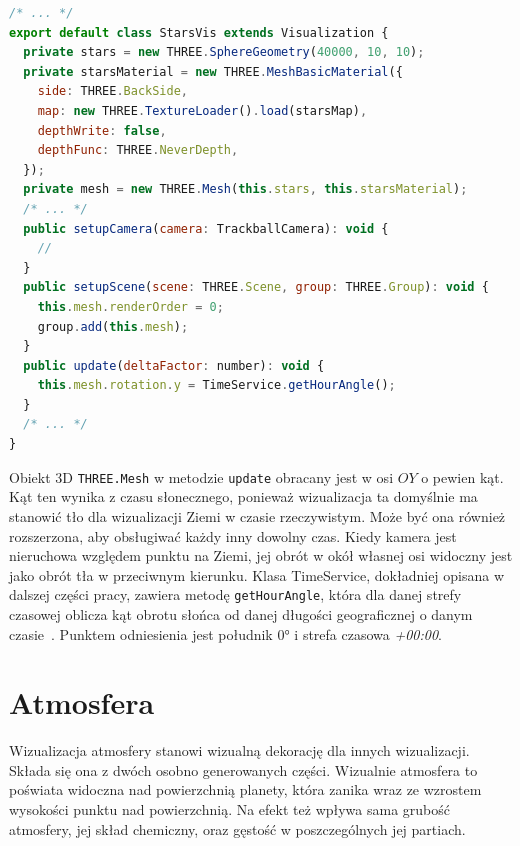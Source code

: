 \begin{lstlisting}[float, language=javascript, label={lst:starsVis}, caption={
    Fragmenty klasy \texttt{StarsVis}}
]
/* ... */
export default class StarsVis extends Visualization {
  private stars = new THREE.SphereGeometry(40000, 10, 10);
  private starsMaterial = new THREE.MeshBasicMaterial({
    side: THREE.BackSide,
    map: new THREE.TextureLoader().load(starsMap),
    depthWrite: false,
    depthFunc: THREE.NeverDepth,
  });
  private mesh = new THREE.Mesh(this.stars, this.starsMaterial);
  /* ... */
  public setupCamera(camera: TrackballCamera): void {
    //
  }
  public setupScene(scene: THREE.Scene, group: THREE.Group): void {
    this.mesh.renderOrder = 0;
    group.add(this.mesh);
  }
  public update(deltaFactor: number): void {
    this.mesh.rotation.y = TimeService.getHourAngle();
  }
  /* ... */
}
\end{lstlisting}

Obiekt 3D \texttt{THREE.Mesh} w metodzie \texttt{update} obracany jest w osi $OY$ o pewien kąt. Kąt ten wynika z czasu słonecznego, ponieważ wizualizacja ta domyślnie ma stanowić tło dla wizualizacji Ziemi w czasie rzeczywistym. Może być ona również rozszerzona, aby obsługiwać każdy inny dowolny czas. Kiedy kamera jest nieruchowa względem punktu na Ziemi, jej obrót w okół własnej osi widoczny jest jako obrót tła w przeciwnym kierunku. Klasa TimeService, dokładniej opisana w dalszej części pracy, zawiera metodę \texttt{getHourAngle}, która dla danej strefy czasowej oblicza kąt obrotu słońca od danej długości geograficznej o danym czasie~\cite{SolarTime}. Punktem odniesienia jest południk $\ang{0}$ i strefa czasowa \textit{+00:00}. 

\section{Atmosfera}

Wizualizacja atmosfery stanowi wizualną dekorację dla innych wizualizacji. Składa się ona z dwóch osobno generowanych części. Wizualnie atmosfera to poświata widoczna nad powierzchnią planety, która zanika wraz ze wzrostem wysokości punktu nad powierzchnią. Na efekt też wpływa sama grubość atmosfery, jej skład chemiczny, oraz gęstość w poszczególnych jej partiach.

